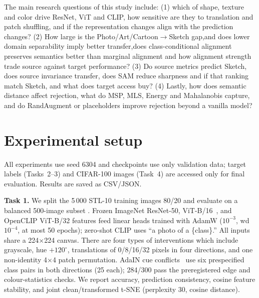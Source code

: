 \documentclass{article}
\begin{document}
The main research questions of this study include: (1) which of shape, texture and color drive ResNet, ViT and CLIP, how sensitive are they to translation and patch shuffling, and if the representation changes align with the prediction changes? (2) How large is the Photo/Art/Cartoon$\to$Sketch gap,and does lower domain separability imply better transfer,does class-conditional alignment preserves semantics better than marginal alignment and how alignment strength trade source against target performance? (3) Do source metrics predict Sketch, does source invariance transfer, does SAM reduce sharpness and if that ranking match Sketch, and what does target access buy? (4) Lastly, how does semantic distance affect rejection, what do MSP, MLS, Energy and Mahalanobis capture, and do RandAugment or placeholders improve rejection beyond a vanilla model?


\section{Experimental setup}
\label{sec:setup}
All experiments use seed 6304 and checkpoints use only validation data; target labels (Tasks~2--3) and CIFAR-100 images (Task~4) are accessed only for final evaluation. Results are saved as CSV/JSON.

\textbf{Task 1.} We split the 5\,000 STL-10 training images 80/20 and evaluate on a balanced 500-image subset \cite{coates2011stl10}. Frozen ImageNet ResNet-50, ViT-B/16~\cite{dosovitskiy2021vit}, and OpenCLIP ViT-B/32 \cite{radford2021clip} features feed linear heads trained with AdamW ($10^{-3}$, wd $10^{-4}$, at most 50 epochs); zero-shot CLIP uses ``a photo of a \{class\}.'' All inputs share a 224$\times$224 canvas. There are four types of interventions which include grayscale, hue $+120^\circ$, translations of 0/8/16/32 pixels in four directions, and one non-identity 4$\times$4 patch permutation. AdaIN cue conflicts~\cite{huang2017adain} use six prespecified class pairs in both directions (25 each); 284/300 pass the preregistered edge and colour-statistics checks. We report accuracy, prediction consistency, cosine feature stability, and joint clean/transformed t-SNE (perplexity 30, cosine distance).
\end{document}

